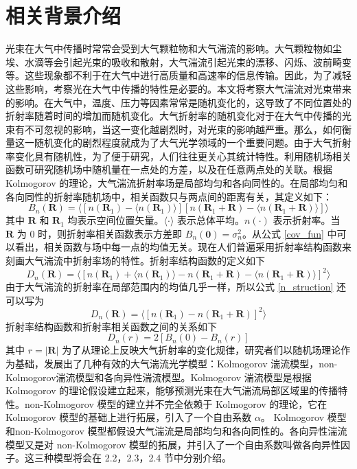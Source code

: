 \documentclass[master]{thesis-uestc}
\begin{document}
\section{相关背景介绍}
光束在大气中传播时常常会受到大气颗粒物和大气湍流的影响。大气颗粒物如尘埃、水滴等会引起光束的吸收和散射，大气湍流引起光束的漂移、闪烁、波前畸变等。这些现象都不利于在大气中进行高质量和高速率的信息传输。因此，为了减轻这些影响，考察光在大气中传播的特性是必要的。本文将考察大气湍流对光束带来的影响。在大气中，温度、压力等因素常常是随机变化的，这导致了不同位置处的折射率随着时间的增加而随机变化。大气折射率的随机变化对于在大气中传播的光束有不可忽视的影响，当这一变化越剧烈时，对光束的影响越严重。那么，如何衡量这一随机变化的剧烈程度就成为了大气光学领域的一个重要问题。由于大气折射率变化具有随机性，为了便于研究，人们往往更关心其统计特性。利用随机场相关函数可研究随机场中随机量在一点处的方差，以及在任意两点处的关联。根据 Kolmogorov 的理论，大气湍流折射率场是局部均匀和各向同性的。在局部均匀和各向同性的折射率随机场中，相关函数只与两点间的距离有关，其定义如下：
\begin{equation}\label{cov_fun}
B_{n}(\textbf{R})=\langle[n(\textbf{R}_1)-\langle n(\textbf{R}_1)\rangle][n(\textbf{R}_1+\textbf{R})-\langle n(\textbf{R}_1+\textbf{R})\rangle]\rangle
\end{equation}
其中 $\textbf{R}$ 和 $\textbf{R}_1$ 均表示空间位置矢量。$\langle\cdot\rangle$ 表示总体平均。$n(\cdot)$ 表示折射率。当 $\textbf{R}$ 为 0 时，则折射率相关函数表示方差即 $B_{n}(\textbf{0})=\sigma_{n}^2$。从公式 \eqref{cov_fun} 中可以看出，相关函数与场中每一点的均值无关。现在人们普遍采用折射率结构函数来刻画大气湍流中折射率场的特性。折射率结构函数的定义如下
\begin{equation}\label{n_struction}
D_{n}(\textbf{R})=\langle[n(\textbf{R}_1)+\langle n(\textbf{R}_1)\rangle-n(\textbf{R}_1+\textbf{R})-\langle n(\textbf{R}_1+\textbf{R})\rangle]^2\rangle
\end{equation}
由于大气湍流的折射率在局部范围内的均值几乎一样，所以公式 \eqref{n_struction} 还可以写为
\begin{equation}\label{n_struction}
D_{n}(\textbf{R})=\langle[n(\textbf{R}_1)-n(\textbf{R}_1+\textbf{R})]^2\rangle
\end{equation}
折射率结构函数和折射率相关函数之间的关系如下
\begin{equation}\label{Kolmogorov_s_s}
D_{n}(r)=2[B_{n}(0)-B_{n}(r)]
\end{equation}
其中 $r=|\textbf{R}|$ 为了从理论上反映大气折射率的变化规律，研究者们以随机场理论作为基础，发展出了几种有效的大气湍流光学模型：Kolmogorov 湍流模型，non-Kolmogorov湍流模型和各向异性湍流模型。Kolmogorov 湍流模型是根据 Kolmogorov 的理论假设建立起来，能够预测光束在大气湍流局部区域里的传播特性。non-Kolmogorov 模型的建立并不完全依赖于 Kolmogorov 的理论，它在 Kolmogorov 模型的基础上进行拓展，引入了一个自由系数 $\alpha$。 Kolmogorov 模型和non-Kolmogorov 模型都假设大气湍流是局部均匀和各向同性的。各向异性湍流模型又是对 non-Kolmogorov 模型的拓展，并引入了一个自由系数叫做各向异性因子。这三种模型将会在 2.2，2.3，2.4 节中分别介绍。
\end{document}
